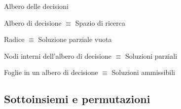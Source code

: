 \begin{frame}{Albero delle decisioni}

\BI
\item \alert{Albero di decisione} $\equiv$ Spazio di ricerca
\item \alert{Radice} $\equiv$ Soluzione parziale vuota
\item \alert{Nodi interni dell'albero di decisione} $\equiv$ Soluzioni parziali  
\item \alert{Foglie in un albero di decisione} $\equiv$ Soluzioni ammissibili 
\EI

\medskip
\begin{overprint}
\centerline{}
\centerline{}
\centerline{}
\centerline{}
\centerline{}
\centerline{}
\centerline{}
\centerline{}
\centerline{}
\centerline{}
\end{overprint}

\end{frame}


\subsection{Sottoinsiemi e permutazioni}

